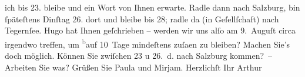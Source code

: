 \begin{ledgroupsized}[t]{13cm}
               ich bis 23. bleibe und ein Wort von Ihnen erwarte. Radle dann nach Salzburg, bin ſpäteſtens Dinſtag 26.
               dort und bleibe bis 28; radle da{\geminationn} (in
               Geſellſchaft) {\pb}nach Tegernſee. Hugo hat Ihnen geſchrieben
               – werden wir uns alſo am 9. Auguſt circa irgendwo treffen, um \substVorne{}\textsuperscript{\textcolor{gray}{b}}\substDazwischen{}a\substHinten{}uf 10 Tage mindeſtens zuſa{\geminationm}en zu bleiben? Machen
               Sie’s doch möglich. Können Sie zwiſchen 23 u 26. d. nach
                  Salzburg kommen? – Arbeiten Sie was?\pend
           \pstart
           Grüßen Sie Paula und Mirjam.\pend
           \pstart Herzlichſt Ihr \spacefill\mbox{Arthur}\pend{}
         
         \endnumbering{}\end{ledgroupsized}  \newcommand{\dateiname}{L00819}\newcommand{\titel}{Arthur Schnitzler an Richard Beer-Hofmann, 15. 7. 1898}\newcommand{\editorInnen}{Martin Anton Müller und Gerd-Hermann Susen}
      